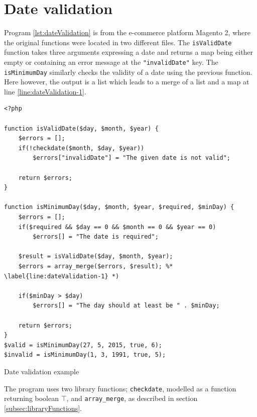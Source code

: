 \newpage
\section{Date validation}
Program \ref{lst:dateValidation} is from the e-commerce platform Magento 2, where the original functions were located in two different files. The \texttt{isValidDate} function takes three arguments expressing a date and returns a map being either empty or containing an error message at the \texttt{"invalidDate"} key.  The \texttt{isMinimumDay} similarly checks the validity of a date using the previous function. Here however, the output is a list which leads to a merge of a list and a map at line \ref{line:dateValidation-1}. 

\begin{program}
\begin{lstlisting}
<?php

function isValidDate($day, $month, $year) {
    $errors = [];
    if(!checkdate($month, $day, $year))
        $errors["invalidDate"] = "The given date is not valid";

    return $errors;
}

function isMinimumDay($day, $month, $year, $required, $minDay) {
    $errors = [];
    if($required && $day == 0 && $month == 0 && $year == 0)
        $errors[] = "The date is required";

    $result = isValidDate($day, $month, $year);
    $errors = array_merge($errors, $result); %* \label{line:dateValidation-1} *)

    if($minDay > $day)
        $errors[] = "The day should at least be " . $minDay;

    return $errors;
}
$valid = isMinimumDay(27, 5, 2015, true, 6);
$invalid = isMinimumDay(1, 3, 1991, true, 5);
\end{lstlisting}
\caption{Date validation example}
\label{lst:dateValidation}
\end{program}

The program uses two library functions; \texttt{checkdate}, modelled as a function returning boolean $\top$, and \texttt{array\_merge}, as described in section \ref{subsec:libraryFunctions}.






